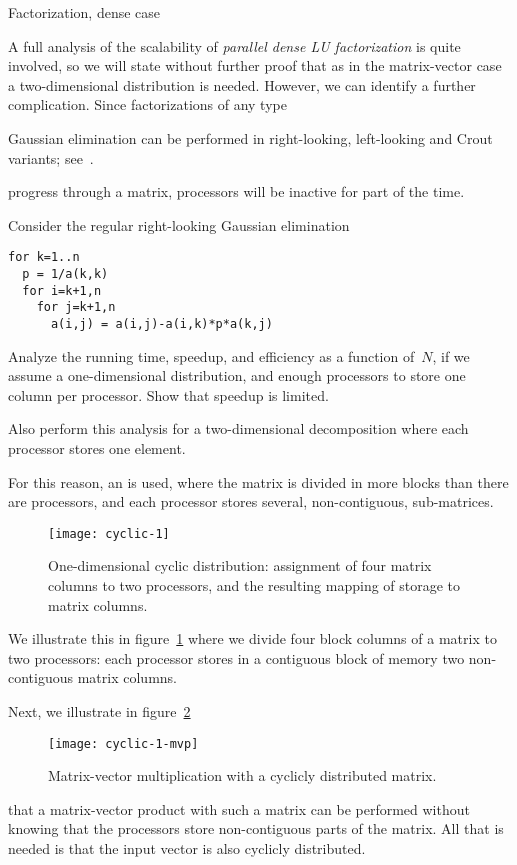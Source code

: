 
 {Factorization, dense case}
\label{sec:LUscaling}

A full analysis of the scalability of
%
\emph{parallel dense LU factorization}
%
is quite
involved, so we will state without further proof that as in the matrix-vector case a
two-dimensional distribution is needed. However, we can identify a
further complication. Since factorizations of any
type
\begin{footnoteenv}
  {Gaussian elimination can be performed in right-looking,
    left-looking and Crout variants; see~\cite{TSoPMC}.}
\end{footnoteenv}
progress through a matrix, processors will be inactive for part of the
time.

\begin{exercise}
  Consider the regular right-looking Gaussian elimination
\begin{verbatim}
for k=1..n
  p = 1/a(k,k)
  for i=k+1,n
    for j=k+1,n
      a(i,j) = a(i,j)-a(i,k)*p*a(k,j)
\end{verbatim}
  Analyze the running time, speedup, and efficiency as a function
  of~$N$, if we assume a one-dimensional distribution, and enough
  processors to store one column per processor. Show that speedup is
  limited.

  Also perform this analysis for a two-dimensional decomposition where
  each processor stores one element.
\end{exercise}


For this reason, an  is used, where
the matrix is divided in more blocks than there are processors,
and each processor stores several, non-contiguous, sub-matrices. 
\begin{figure}[ht]
  \texttt{[image: cyclic-1]}
  \caption{One-dimensional cyclic distribution: assignment of four
    matrix columns to two processors, and the resulting mapping of
    storage to matrix columns.}
  \label{fig:cyclic-1}
\end{figure}
We illustrate this in figure~\ref{fig:cyclic-1} where we divide four
block columns of a matrix to two processors: each processor stores in
a contiguous block of memory two non-contiguous matrix columns.

Next, we illustrate in figure~\ref{fig:cyclic-1-mvp}
\begin{figure}[ht]
  \texttt{[image: cyclic-1-mvp]}
  \caption{Matrix-vector multiplication with a cyclicly distributed matrix.}
  \label{fig:cyclic-1-mvp}
\end{figure}
that a matrix-vector product with such a matrix can be performed
without knowing that the processors store non-contiguous parts of the
matrix. All that is needed is that the input vector is also cyclicly
distributed.

